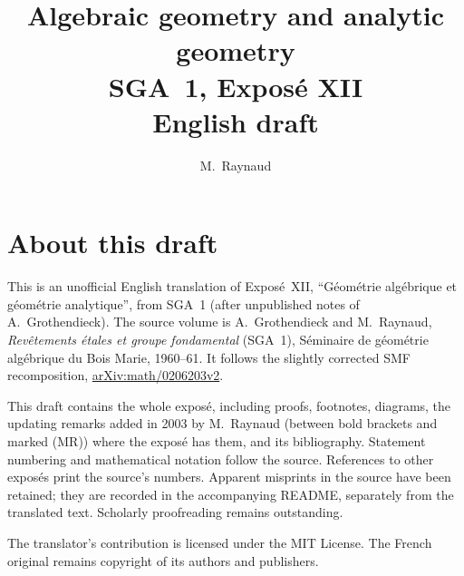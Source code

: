 \documentclass[11pt,a4paper,oneside]{amsbook}
\title[SGA~1, Expos\'e XII (English draft)]{Algebraic geometry and analytic geometry\\
{\normalsize SGA~1, Expos\'e XII\\English draft}}
\author{M.\ Raynaud}
\date{}
\begin{document}
\frontmatter
\maketitle

\chapter*{About this draft}
This is an unofficial English translation of Expos\'e~XII,
``G\'eom\'etrie alg\'ebrique et g\'eom\'etrie analytique'', from SGA~1 (after unpublished notes of A.\ Grothendieck). The source volume is
A.\ Grothendieck and M.\ Raynaud,
\textit{Rev\^etements \'etales et groupe fondamental} (SGA~1),
S\'eminaire de g\'eom\'etrie alg\'ebrique du Bois Marie, 1960--61.
It follows the slightly corrected SMF recomposition,
\href{https://arxiv.org/abs/math/0206203v2}{arXiv:math/0206203v2}.

This draft contains the whole expos\'e, including proofs, footnotes,
diagrams, the updating remarks added in 2003 by M.~Raynaud (between bold
brackets and marked (MR)) where the expos\'e has them, and its bibliography.
Statement numbering and mathematical notation follow the source.
References to other expos\'es print the source's numbers. Apparent
misprints in the source have been retained; they are recorded in the
accompanying README, separately from the translated text. Scholarly
proofreading remains outstanding.

The translator's contribution is licensed under
the MIT License.
The French original remains copyright of its authors and publishers.

\tableofcontents
\mainmatter
\setcounter{chapter}{11}



\end{document}
